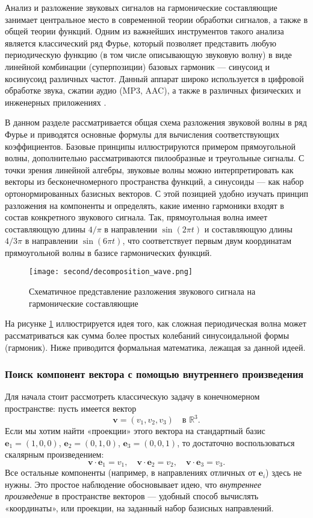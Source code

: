 \documentclass[bachelor, och, diploma]{SCWorks}
\begin{document}
Анализ и разложение звуковых сигналов на гармонические составляющие занимает центральное место в современной теории обработки сигналов, а также в общей теории функций. Одним из важнейших инструментов такого анализа является классический ряд Фурье, который позволяет представить любую периодическую функцию (в том числе описывающую звуковую волну) в виде линейной комбинации (суперпозиции) базовых гармоник — синусоид и косинусоид различных частот. Данный аппарат широко используется в цифровой обработке звука, сжатии аудио (MP3, AAC), а также в различных физических и инженерных приложениях \cite{tolstov}. 

В данном разделе рассматривается общая схема разложения звуковой волны в ряд Фурье и приводятся основные формулы для вычисления соответствующих коэффициентов. Базовые принципы иллюстрируются примером прямоугольной волны, дополнительно рассматриваются пилообразные и треугольные сигналы. С точки зрения линейной алгебры, звуковые волны можно интерпретировать как векторы из бесконечномерного пространства функций, а синусоиды — как набор ортонормированных базисных векторов. С этой позицией удобно изучать принцип разложения на компоненты и определять, какие именно гармоники входят в состав конкретного звукового сигнала. Так, прямоугольная волна имеет составляющую длины $4/\pi$ в направлении $\sin(2\pi t)$ и составляющую длины $4/3\pi$ в направлении $\sin(6\pi t)$, что соответствует первым двум координатам прямоугольной волны в базисе гармонических функций.

\begin{figure}[h!]
  \centering
  \texttt{[image: second/decomposition\_wave.png]}
  \caption{Схематичное представление разложения звукового сигнала на гармонические составляющие}
  \label{fig:fourier_illustration}
\end{figure}

На рисунке \ref{fig:fourier_illustration} иллюстрируется идея того, как сложная периодическая волна может рассматриваться как сумма более простых колебаний синусоидальной формы (гармоник). Ниже приводится формальная математика, лежащая за данной идеей.

\subsubsection{Поиск компонент вектора с помощью внутреннего произведения}

Для начала стоит рассмотреть классическую задачу в конечномерном пространстве: пусть имеется вектор 
\[
\mathbf{v} = (v_1, v_2, v_3) \quad \text{в } \mathbb{R}^3.
\]
Если мы хотим найти «проекции» этого вектора на стандартный базис \(\mathbf{e}_1 = (1,0,0)\), \(\mathbf{e}_2 = (0,1,0)\), \(\mathbf{e}_3 = (0,0,1)\), то достаточно воспользоваться скалярным произведением:
\[
\mathbf{v} \cdot \mathbf{e}_1 = v_1, \quad 
\mathbf{v} \cdot \mathbf{e}_2 = v_2, \quad
\mathbf{v} \cdot \mathbf{e}_3 = v_3.
\]
Все остальные компоненты (например, в направлениях отличных от \(\mathbf{e}_i\)) здесь не нужны. Это простое наблюдение обосновывает идею, что \textit{внутреннее произведение} в пространстве векторов — удобный способ вычислять «координаты», или проекции, на заданный набор базисных направлений.
\end{document}
